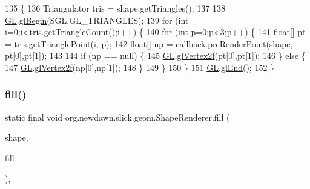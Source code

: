 \begin{DoxyCode}
135                                                                         \{
136         Triangulator tris = shape.getTriangles();
137 
138         \mbox{\hyperlink{classorg_1_1newdawn_1_1slick_1_1geom_1_1_shape_renderer_a6116897ec2e7979b9ca9d406a4dfd566}{GL}}.\mbox{\hyperlink{interfaceorg_1_1newdawn_1_1slick_1_1opengl_1_1renderer_1_1_s_g_l_a34ef78aa5f8f5774c06117a01932fb02}{glBegin}}(SGL.GL\_TRIANGLES);
139         \textcolor{keywordflow}{for} (\textcolor{keywordtype}{int} i=0;i<tris.getTriangleCount();i++) \{
140             \textcolor{keywordflow}{for} (\textcolor{keywordtype}{int} p=0;p<3;p++) \{
141                 \textcolor{keywordtype}{float}[] pt = tris.getTrianglePoint(i, p);
142                 \textcolor{keywordtype}{float}[] np = callback.preRenderPoint(shape, pt[0],pt[1]);
143                 
144                 \textcolor{keywordflow}{if} (np == null) \{
145                     \mbox{\hyperlink{classorg_1_1newdawn_1_1slick_1_1geom_1_1_shape_renderer_a6116897ec2e7979b9ca9d406a4dfd566}{GL}}.\mbox{\hyperlink{interfaceorg_1_1newdawn_1_1slick_1_1opengl_1_1renderer_1_1_s_g_l_ad9c89f8bb275f22956f7687da5ec27c5}{glVertex2f}}(pt[0],pt[1]);
146                 \} \textcolor{keywordflow}{else} \{
147                     \mbox{\hyperlink{classorg_1_1newdawn_1_1slick_1_1geom_1_1_shape_renderer_a6116897ec2e7979b9ca9d406a4dfd566}{GL}}.\mbox{\hyperlink{interfaceorg_1_1newdawn_1_1slick_1_1opengl_1_1renderer_1_1_s_g_l_ad9c89f8bb275f22956f7687da5ec27c5}{glVertex2f}}(np[0],np[1]);
148                 \}
149             \}
150         \}
151         \mbox{\hyperlink{classorg_1_1newdawn_1_1slick_1_1geom_1_1_shape_renderer_a6116897ec2e7979b9ca9d406a4dfd566}{GL}}.\mbox{\hyperlink{interfaceorg_1_1newdawn_1_1slick_1_1opengl_1_1renderer_1_1_s_g_l_a7f5666aaa59b12617ab81e1263140f72}{glEnd}}();
152     \}
\end{DoxyCode}
\mbox{\label{classorg_1_1newdawn_1_1slick_1_1geom_1_1_shape_renderer_a9a7fb180ff23414255aa33ac68a9df9e}} 
\subsubsection{\texorpdfstring{fill()}{fill()}\hspace{0.1cm}{\footnotesize\ttfamily [3/3]}}
{\footnotesize\ttfamily static final void org.\+newdawn.\+slick.\+geom.\+Shape\+Renderer.\+fill (\begin{DoxyParamCaption}\item[{final \mbox{\hyperlink{classorg_1_1newdawn_1_1slick_1_1geom_1_1_shape}{Shape}}}]{shape,  }\item[{final \mbox{\hyperlink{interfaceorg_1_1newdawn_1_1slick_1_1_shape_fill}{Shape\+Fill}}}]{fill }\end{DoxyParamCaption})\hspace{0.3cm}{\ttfamily [inline]}, {\ttfamily [static]}}

